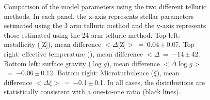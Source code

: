 \begin{figure}
\begin{center}
 \end{center}
 \caption[Best-fit parameter comparison using the two telluric methods]{
            Comparison of the model parameters using the two different telluric methods.
            In each panel, the x-axis represents stellar parameters estimated using the 3 arm telluric
            method and the y-axis represents those estimated using the 24 arm telluric method.
            Top left: metallicity ([Z]), mean difference
            $<\Delta[$Z$]>$~=~0.04\,$\pm$\,0.07.
            Top right: effective temperature (\Teff), mean difference
            $<\Delta $\Teff~=~$-$14\,$\pm$\,42.
            Bottom left: surface gravity ($\log g$), mean difference
            $<\Delta \log g>$~=~$-$0.06\,$\pm$\,0.12.
            Bottom right: Microturbulence ($\xi$), mean difference
            $<\Delta \xi>$~=~$-$0.1\,$\pm$\,0.1.
            In all cases, the distributions are statistically consistent with a one-to-one ratio (black lines).
          }
 \label{fig:3vs24AT}
\end{figure}


